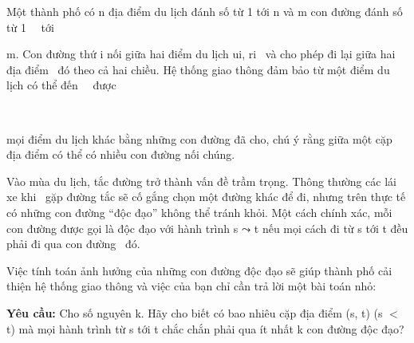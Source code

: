 Một thành phố có n địa điểm du lịch đánh số từ 1 tới n và m con đường đánh số từ 1   tới

m. Con đường thứ i nối giữa hai điểm du lịch ui, ri  và cho phép đi lại giữa hai địa điểm  đó theo cả hai chiều. Hệ thống giao thông đảm bảo từ một điểm du lịch có thể đến   được

 

mọi điểm du lịch khác bằng những con đường đã cho, chú ý rằng giữa một cặp địa điểm có thể có nhiều con đường nối chúng.

Vào mùa du lịch, tắc đường trở thành vấn đề trầm trọng. Thông thường các lái xe khi  gặp đường tắc sẽ cố gắng chọn một đường khác để đi, nhưng trên thực tế có những con đường “độc đạo” không thể tránh khỏi. Một cách chính xác, mỗi con đường được gọi là độc đạo với hành trình s ⤳ t nếu mọi cách đi từ s tới t đều phải đi qua con đường  đó.

Việc tính toán ảnh hưởng của những con đường độc đạo sẽ giúp thành phố cải thiện hệ thống giao thông và việc của bạn chỉ cần trả lời một bài toán nhỏ:

\textbf{Yêu cầu: }Cho số nguyên k. Hãy cho biết có bao nhiêu cặp địa điểm (s, t) (s $<$ t) mà mọi hành trình từ s tới t chắc chắn phải qua ít nhất k con đường độc đạo?